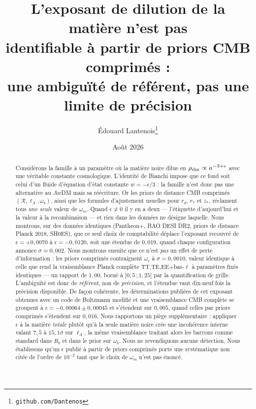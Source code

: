 \documentclass[11pt,a4paper]{article}
\title{\bf L'exposant de dilution de la matière n'est pas\\
identifiable à partir de priors CMB comprimés :\\
une ambiguïté de référent, pas une limite de précision}
\author{Édouard Lantenois\thanks{\texttt{github.com/Dantenos}}}
\date{Août 2026}
\begin{document}
\maketitle

\begin{abstract}
\noindent
Considérons la famille à un paramètre où la matière noire dilue en
$\rho_{\rm dm}\propto a^{-3+\epsilon}$ avec une véritable constante cosmologique.
L'identité de Bianchi impose que ce fond soit celui d'un fluide d'équation d'état constante
$w=-\epsilon/3$ : la famille n'est donc pas une alternative au $\Lambda w$DM mais sa
réécriture. Or les priors de distance CMB comprimés $(\mathcal{R}, \ell_A, \omega_b)$, ainsi
que les formules d'ajustement usuelles pour $r_d$, $r_\ast$ et $z_\ast$, réclament tous
\emph{une seule} valeur de $\omega_m$. Quand $\epsilon\neq0$ il y en a deux --- l'étiquette
d'aujourd'hui et la valeur à la recombinaison --- et rien dans les données ne désigne
laquelle. Nous montrons, sur des données identiques (Pantheon+, BAO DESI DR2, priors de
distance Planck 2018, SH0ES), que ce seul choix de comptabilité déplace l'exposant recouvré
de $\epsilon=+0{,}0070$ à $\epsilon=-0{,}0120$, soit une étendue de $0{,}019$, quand chaque
configuration annonce $\sigma\simeq0{,}002$. Nous montrons ensuite que ce n'est
\emph{pas} un effet de perte d'information : les priors comprimés contraignent $\omega_c$ à
$\sigma=0{,}0010$, valeur identique à celle que rend la vraisemblance Planck complète
TT,TE,EE$+$bas-$\ell$ à paramètres fixés identiques --- un rapport de $1{,}00$, borné à
$]0{,}5\,;1{,}25[$ par la quantification de grille. L'ambiguïté est donc de \emph{référent},
non de \emph{précision}, et l'étendue vaut dix-neuf fois la précision disponible. De façon
cohérente, les déterminations publiées de cet exposant obtenues avec un code de Boltzmann
modifié et une vraisemblance CMB complète se groupent à $\epsilon = -0{,}00064\pm0{,}00045$
et s'étendent sur $0{,}005$, quand celles par priors comprimés s'étendent sur $0{,}016$. Nous
rapportons un piège supplémentaire : appliquer $\epsilon$ à la matière \emph{totale} plutôt
qu'à la seule matière noire crée une incohérence interne valant $7{,}5$ à $15{,}1\sigma$ sur
$\ell_A$, la même vraisemblance traitant alors les baryons comme standard dans $R_b$ et dans
le prior sur $\omega_b$. Nous ne revendiquons aucune détection. Nous établissons qu'un
$\epsilon$ publié à partir de priors comprimés porte une systématique non citée de l'ordre de
$10^{-2}$ tant que le choix de $\omega_m$ n'est pas énoncé.
\end{abstract}
\end{document}
